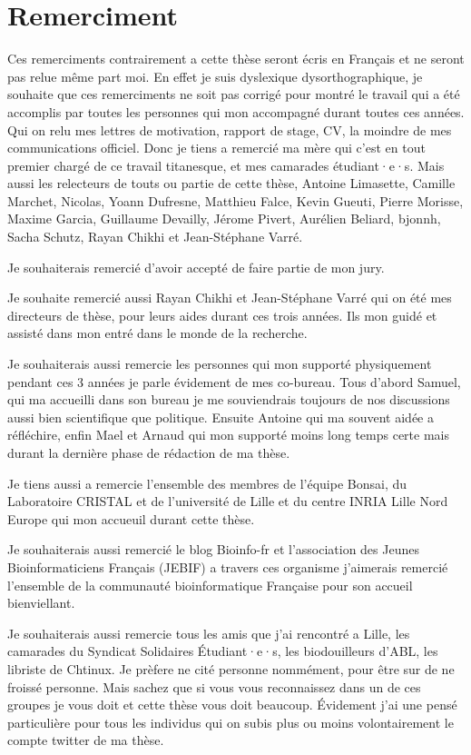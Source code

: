 \documentclass[main.tex]{subfiles}
\begin{document}
\section*{Remerciment}
%

Ces remerciments contrairement a cette thèse seront écris en Français et ne seront pas relue même part moi. En effet je suis dyslexique dysorthographique, je souhaite que ces remerciments ne soit pas corrigé pour montré le travail qui a été accomplis par toutes les personnes qui mon accompagné durant toutes ces années. Qui on relu mes lettres de motivation, rapport de stage, CV, la moindre de mes communications officiel. Donc je tiens a remercié ma mère qui c'est en tout premier chargé de ce travail titanesque, et mes camarades étudiant·e·s. Mais aussi les relecteurs de touts ou partie de cette thèse, Antoine Limasette, Camille Marchet, Nicolas, Yoann Dufresne, Matthieu Falce, Kevin Gueuti, Pierre Morisse, Maxime Garcia, Guillaume Devailly, Jérome Pivert, Aurélien Beliard, bjonnh, Sacha Schutz, Rayan Chikhi et Jean-Stéphane Varré.

Je souhaiterais remercié  d'avoir accepté de faire partie de mon jury.

Je souhaite remercié aussi Rayan Chikhi et Jean-Stéphane Varré qui on été mes directeurs de thèse, pour leurs aides durant ces trois années. Ils mon guidé et assisté dans mon entré dans le monde de la recherche.

Je souhaiterais aussi remercie les personnes qui mon supporté physiquement pendant ces 3 années je parle évidement de mes co-bureau. Tous d'abord Samuel, qui ma accueilli dans son bureau je me souviendrais toujours de nos discussions aussi bien scientifique que politique. Ensuite Antoine qui ma souvent aidée a réfléchire, enfin Mael et Arnaud qui mon supporté moins long temps certe mais durant la dernière phase de rédaction de ma thèse.

Je tiens aussi a remercie l'ensemble des membres de l'équipe Bonsai, du Laboratoire CRISTAL et de l'université de Lille et du centre INRIA Lille Nord Europe qui mon accueuil durant cette thèse.

Je souhaiterais aussi remercié le blog Bioinfo-fr et l'association des Jeunes Bioinformaticiens Français (JEBIF) a travers ces organisme j'aimerais remercié  l'ensemble de la communauté bioinformatique Française pour son accueil bienviellant.

Je souhaiterais aussi remercie tous les amis que j'ai rencontré a Lille, les camarades du Syndicat Solidaires Étudiant·e·s, les biodouilleurs d'ABL, les libriste de Chtinux. Je prèfere ne cité personne nommément, pour être sur de ne froissé personne. Mais sachez que si vous vous reconnaissez dans un de ces groupes je vous doit et cette thèse vous doit beaucoup. Évidement j'ai une pensé particulière pour tous les individus qui on subis plus ou moins volontairement le compte twitter de ma thèse. 
\end{document}
